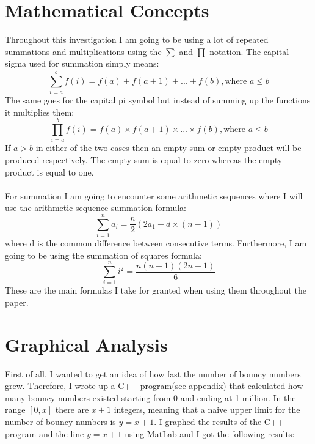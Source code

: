 \documentclass[titlepage,12pt]{article}
\begin{document}
\section{Mathematical Concepts}
Throughout this investigation I am going to be using a lot of repeated summations and multiplications using the $\sum$ and $\prod$ notation. The capital sigma used for summation simply means:
\[\sum_{i=a}^{b} f(i) = f(a) + f(a+1) + ... + f(b), \text{where } a \leq b\]
The same goes for the capital pi symbol but instead of summing up the functions it multiplies them:
\[\prod_{i=a}^{b} f(i) = f(a) \times f(a+1) \times ... \times f(b), \text{where } a \leq b\]
If $a > b$ in either of the two cases then an empty sum or empty product will be produced respectively. The empty sum is equal to zero whereas the empty product is equal to one.
\\
\\
For summation I am going to encounter some arithmetic sequences where I will use the arithmetic sequence summation formula:
\[\sum_{i=1}^{n} a_i = \frac{n}{2}(2a_1 + d \times (n-1))\]
where d is the common difference between consecutive terms. Furthermore, I am going to be using the summation of squares formula\cite{Formulas}:
\[\sum_{i=1}^{n} i^2 = \frac{n(n+1)(2n+1)}{6}\]
These are the main formulas I take for granted when using them throughout the paper.
\newpage

\section{Graphical Analysis}
First of all, I wanted to get an idea of how fast the number of bouncy numbers grew. Therefore, I wrote up a C++ program(see appendix) that calculated how many bouncy numbers existed starting from 0 and ending at 1 million. In the range $[0,x]$ there are $x+1$ integers, meaning that a naive upper limit for the number of bouncy numbers is $y=x+1$. I graphed the results of the C++ program and the line $y=x+1$ using MatLab and I got the following results:
\end{document}
